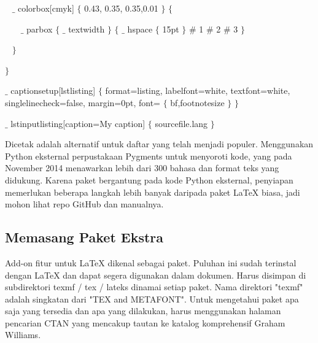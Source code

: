 {\fontsize{10pt}{10pt}\selectfont ~  $ \_ $ colorbox[cmyk] $ \{ $ 0.43, 0.35, 0.35,0.01  $ \} $  $ \{ $ }\par

{\fontsize{10pt}{10pt}\selectfont ~~~  $ \_ $ parbox $ \{ $  $ \_ $ textwidth $ \} $  $ \{ $  $ \_ $ hspace $ \{ $ 15pt $ \} $  $\#$ 1 $\#$ 2 $\#$ 3 $ \} $ }\par

{\fontsize{10pt}{10pt}\selectfont ~  $ \} $ }\par

{\fontsize{10pt}{10pt}\selectfont  $ \} $ }\par

{\fontsize{10pt}{10pt}\selectfont  $ \_ $ captionsetup[lstlisting] $ \{ $  format=listing, labelfont=white, textfont=white, singlelinecheck=false, margin=0pt, font= $ \{ $ bf,footnotesize $ \} $   $ \} $ }\par

{\fontsize{10pt}{10pt}\selectfont  $ \_ $ lstinputlisting[caption=My caption] $ \{ $ sourcefile.lang $ \} $ }\par

\vspace{12pt}
\hspace{0.50in} Dicetak adalah alternatif untuk daftar yang telah menjadi populer. Menggunakan Python eksternal perpustakaan Pygments untuk menyoroti kode, yang pada November 2014 menawarkan lebih dari 300 bahasa dan format teks yang didukung. Karena paket bergantung pada kode Python eksternal, penyiapan memerlukan beberapa langkah lebih banyak daripada paket LaTeX biasa, jadi mohon lihat repo GitHub dan manualnya.\par

\subsection {Memasang Paket Ekstra}\par
\hspace{0.50in} Add-on fitur untuk LaTeX dikenal sebagai paket. Puluhan ini sudah terinstal dengan LaTeX dan dapat segera digunakan dalam dokumen. Harus disimpan di subdirektori texmf / tex / lateks dinamai setiap paket. Nama direktori "texmf" adalah singkatan dari "TEX and METAFONT". Untuk mengetahui paket apa saja yang tersedia dan apa yang dilakukan, harus menggunakan halaman pencarian CTAN yang mencakup tautan ke katalog komprehensif Graham Williams.\par

